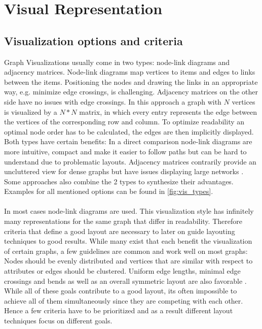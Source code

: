 \section{Visual Representation}
\subsection{Visualization options and criteria}
Graph Visualizations usually come in two types: node-link diagrams and adjacency matrices.
Node-link diagrams map vertices to items and edges to links between the items. Positioning the nodes and drawing the links in an appropriate way, e.g. minimize edge crossings, is challenging. Adjacency matrices on the other side have no issues with edge crossings. In this approach a graph with $N$ vertices is visualized by a $N * N $ matrix, in which every entry represents the edge between the vertices of the corresponding row and column. To optimize readability an optimal node order has to be calculated, the edges are then implicitly displayed.\\
Both types have certain benefits: In a direct comparison node-link diagrams are more intuitive, compact and make it easier to follow paths but can be hard to understand due to problematic layouts. Adjacency matrices contrarily provide an uncluttered view for dense graphs but have issues displaying large networks \cite{Ghoniem2004}. Some approaches also combine the 2 types to synthesize their advantages. Examples for all mentioned options can be found in \autoref{fig:vis_types}.
\\\\
In most cases node-link diagrams are used. This visualization style has infinitely many representations for the same graph that differ in readability. Therefore criteria that define a good layout are necessary to later on guide layouting techniques to good results. While many exist that each benefit the visualization of certain graphs, a few guidelines are common and work well on most graphs: \\
Nodes should be evenly distributed and vertices that are similar with respect to attributes or edges should be clustered. Uniform edge lengths, minimal edge crossings and bends as well as an overall symmetric layout are also favorable \cite{Bennett2007}. \\
While all of these goals contribute to a good layout, its often impossible to achieve all of them simultaneously since they are competing with each other\cite{Gibson2013}. Hence a few criteria have to be prioritized and as a result different layout techniques focus on different goals.
